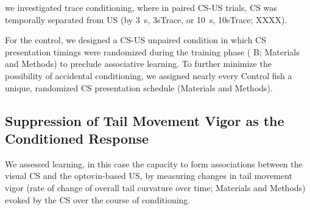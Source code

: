 we investigated trace conditioning, where in paired CS-US trials, CS was temporally separated from US (by 3~s, 3sTrace, or 10~s, 10sTrace;  XXXX).



For the control, we designed a CS-US unpaired condition in which CS presentation timings were randomized during the training phase ( B; Materials and Methods) to preclude associative learning. To further minimize the possibility of accidental conditioning, we assigned nearly every Control fish a unique, randomized CS presentation schedule (Materials and Methods).


\subsection{Suppression of Tail Movement Vigor as the Conditioned Response}
We assessed learning, in this case the capacity to form associations between the visual CS and the optovin-based US, by measuring changes in tail movement vigor (rate of change of overall tail curvature over time; Materials and Methods) evoked by the CS over the course of conditioning.

